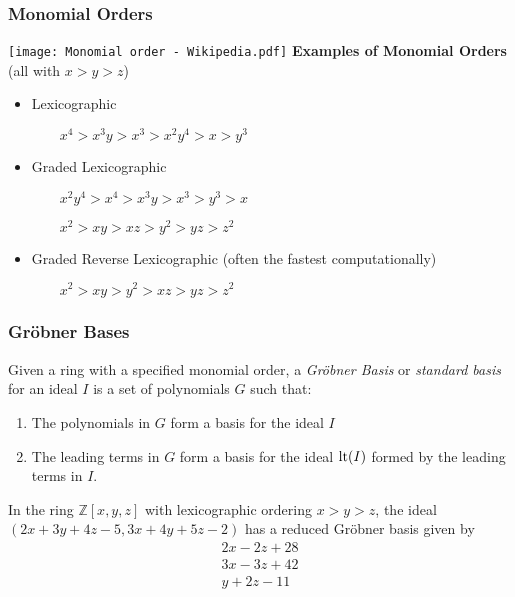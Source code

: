\documentclass[11pt]{beamer}
\begin{document}
\begin{frame}
\frametitle{Monomial Orders}
\texttt{[image: Monomial order - Wikipedia.pdf]}
\vskip 20pt
{\bf Examples of Monomial Orders} (all with $x>y>z$)
\begin{itemize}
\item Lexicographic

$\qquad x^4 > x^3y > x^3 > x^2y^4 > x > y^3$
\item Graded Lexicographic

$\qquad x^2y^4 > x^4 > x^3y > x^3 > y^3 > x$

$\qquad x^2 > xy > xz > y^2 > yz > z^2$
\item Graded Reverse Lexicographic (often the fastest computationally)

$\qquad x^2 > xy > y^2 > xz > yz > z^2$
\end{itemize}
\end{frame}


\begin{frame}
\frametitle{Gr\"obner Bases}
\begin{definition}
Given a ring with a specified monomial order,
a {\it Gr\"obner Basis} or {\it standard basis} for an ideal $I$ is a set of
polynomials $G$ such that:
\begin{enumerate}
\item The polynomials in $G$ form a basis for the ideal $I$
\item The leading terms in $G$ form a basis for the ideal ${\rm lt}(I)$ formed by the leading terms in $I$.
\end{enumerate}
\end{definition}

\begin{example}
In the ring ${\mathbb Z}[x,y,z]$ with lexicographic ordering $x>y>z$, the ideal $(2x+3y+4z-5, 3x+4y+5z-2)$
has a reduced Gr\"obner basis given by
\begin{align*}
2x-2z+28 \\
3x-3z+42 \\
y+2z-11
\end{align*}
\end{example}
\end{frame}
\end{document}
